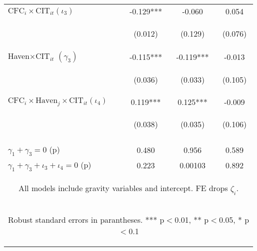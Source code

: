 \begin{center}
\begin{tabular}{lccc}
$\text{CFC}_i\times\text{CIT}_{it}$$ (\iota_3)$ & -0.129*** & -0.060 & 0.054 \\
\vspace{4pt} & \begin{footnotesize}(0.012)\end{footnotesize} & \begin{footnotesize}(0.129)\end{footnotesize} & \begin{footnotesize}(0.076)\end{footnotesize} \\
Haven$\times\text{CIT}_{it}$ $ (\gamma_3)$ & -0.115*** & -0.119*** & -0.013 \\
\vspace{4pt} & \begin{footnotesize}(0.036)\end{footnotesize} & \begin{footnotesize}(0.033)\end{footnotesize} & \begin{footnotesize}(0.105)\end{footnotesize} \\
$\text{CFC}_i\times\text{Haven}_j\times\text{CIT}_{it}$$ (\iota_4)$ & 0.119*** & 0.125*** & -0.009 \\
 & \begin{footnotesize}(0.038)\end{footnotesize} & \begin{footnotesize}(0.035)\end{footnotesize} & \begin{footnotesize}(0.106)\end{footnotesize} \\
\vspace{4pt} & \begin{footnotesize}\end{footnotesize} & \begin{footnotesize}\end{footnotesize} & \begin{footnotesize}\end{footnotesize} \\
$\gamma_1+\gamma_3 =0$ (p) & 0.480 & 0.956 & 0.589 \\
 $\gamma_1+\gamma_3+\iota_3+\iota_4 =0$ (p) & 0.223 & 0.00103 & 0.892 \\ \hline
\multicolumn{4}{c}{\begin{footnotesize} All models include gravity variables and intercept. FE drops $\zeta_i$.\end{footnotesize}} \\
\multicolumn{4}{c}{\begin{footnotesize} Robust standard errors in parantheses. *** p$<$0.01, ** p$<$0.05, * p$<$0.1\end{footnotesize}} \\
\end{tabular}
\end{center}
